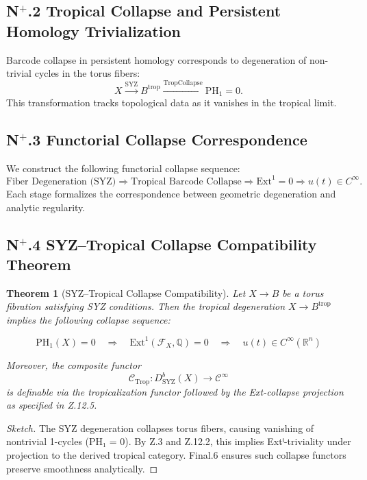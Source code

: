 \documentclass[11pt]{article}
\newtheorem{theorem}{Theorem}[section]
\begin{document}
\begin{axiom}
\begin{axiom}
{{\subsection*{N$^+$.2 Tropical Collapse and Persistent Homology Trivialization}
Barcode collapse in persistent homology corresponds to degeneration of non-trivial cycles in the torus fibers:
\[
X \xrightarrow{\mathrm{SYZ}} B^{\mathrm{trop}} \xrightarrow{\mathrm{TropCollapse}} \mathrm{PH}_1 = 0.
\]
This transformation tracks topological data as it vanishes in the tropical limit.

\subsection*{N$^+$.3 Functorial Collapse Correspondence}
We construct the following functorial collapse sequence:
\[
\text{Fiber Degeneration (SYZ)} \Rightarrow \text{Tropical Barcode Collapse} \Rightarrow \mathrm{Ext}^1 = 0 \Rightarrow u(t) \in C^\infty.
\]
Each stage formalizes the correspondence between geometric degeneration and analytic regularity.

\subsection*{N$^+$.4 SYZ–Tropical Collapse Compatibility Theorem}

\begin{theorem}[SYZ–Tropical Collapse Compatibility]
Let \( X \to B \) be a torus fibration satisfying SYZ conditions.  
Then the tropical degeneration \( X \to B^{\mathrm{trop}} \) implies the following collapse sequence:

\[
\mathrm{PH}_1(X) = 0 \quad \Rightarrow \quad \mathrm{Ext}^1(\mathcal{F}_X, \mathbb{Q}) = 0 \quad \Rightarrow \quad u(t) \in C^\infty(\mathbb{R}^n)
\]

Moreover, the composite functor
\[
\mathcal{C}_{\mathrm{Trop}} : D^b_{\mathrm{SYZ}}(X) \to \mathcal{C}^\infty
\]
is definable via the tropicalization functor followed by the Ext-collapse projection as specified in Z.12.5.
\end{theorem}

\begin{proof}[Sketch]
The SYZ degeneration collapses torus fibers, causing vanishing of nontrivial 1-cycles (PH₁ = 0).  
By Z.3 and Z.12.2, this implies Extⁱ-triviality under projection to the derived tropical category.  
Final.6 ensures such collapse functors preserve smoothness analytically.
\end{proof}



}}
\end{axiom}
\end{axiom}
\end{document}
